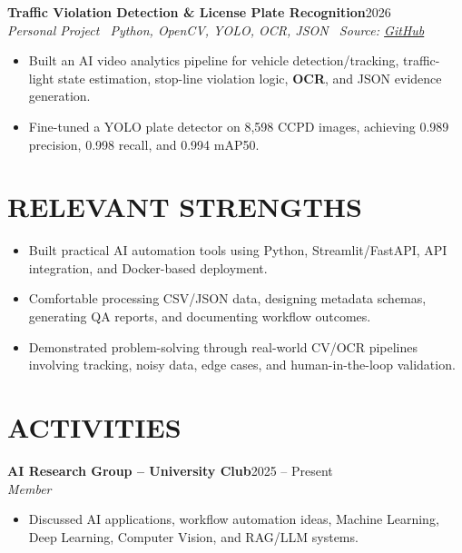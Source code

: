 \documentclass[10pt,a4paper]{article}
\newenvironment{cvitems}{%
    \begin{itemize}[leftmargin=1.1em,itemsep=0pt,topsep=0pt,parsep=0pt]
}{%
    \end{itemize}
}
\newcommand{\entryhead}[2]{%
    \noindent\textbf{#1}\hfill #2\\[-2pt]
}
\newcommand{\entrysub}[1]{%
    \noindent\textit{#1}\\[-1pt]
}
\begin{document}
\entryhead{Traffic Violation Detection \& License Plate Recognition}{2026}
\entrysub{Personal Project \textbar\ Python, OpenCV, YOLO, OCR, JSON \textbar\ Source: \href{https://github.com/NguyenKhacBao564/Traffic-Violation-Detection-and-License-Plate-Recognition}{GitHub}}
\begin{cvitems}
    \item Built an AI video analytics pipeline for vehicle detection/tracking, traffic-light state estimation, stop-line violation logic, \textbf{OCR}, and JSON evidence generation.
    \item Fine-tuned a YOLO plate detector on 8,598 CCPD images, achieving 0.989 precision, 0.998 recall, and 0.994 mAP50.
\end{cvitems}

\section{RELEVANT STRENGTHS}
\begin{cvitems}
    \item Built practical AI automation tools using Python, Streamlit/FastAPI, API integration, and Docker-based deployment.
    \item Comfortable processing CSV/JSON data, designing metadata schemas, generating QA reports, and documenting workflow outcomes.
    \item Demonstrated problem-solving through real-world CV/OCR pipelines involving tracking, noisy data, edge cases, and human-in-the-loop validation.
\end{cvitems}

\section{ACTIVITIES}
\entryhead{AI Research Group -- University Club}{2025 -- Present}
\entrysub{Member}
\begin{cvitems}
    \item Discussed AI applications, workflow automation ideas, Machine Learning, Deep Learning, Computer Vision, and RAG/LLM systems.
\end{cvitems}
\end{document}
